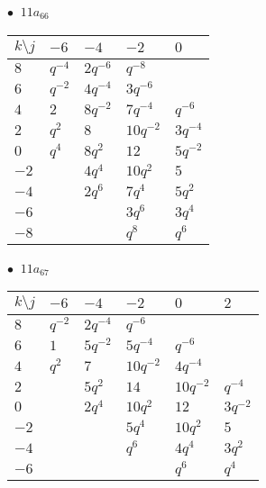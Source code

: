 \begin{minipage}{\linewidth}
$\bullet\ $ $11a_{66}$ \vspace{0.5em} \\
\begin{tabular}{l|llll}
$k \setminus j$ & $-6$ & $-4$ & $-2$ & $0$ \\
\hline
$8$ & $q^{-4}$ & $2q^{-6}$ & $q^{-8}$ &  \\
$6$ & $q^{-2}$ & $4q^{-4}$ & $3q^{-6}$ &  \\
$4$ & $2$ & $8q^{-2}$ & $7q^{-4}$ & $q^{-6}$ \\
$2$ & $q^{2}$ & $8$ & $10q^{-2}$ & $3q^{-4}$ \\
$0$ & $q^{4}$ & $8q^{2}$ & $12$ & $5q^{-2}$ \\
$-2$ &  & $4q^{4}$ & $10q^{2}$ & $5$ \\
$-4$ &  & $2q^{6}$ & $7q^{4}$ & $5q^{2}$ \\
$-6$ &  &  & $3q^{6}$ & $3q^{4}$ \\
$-8$ &  &  & $q^{8}$ & $q^{6}$ \\
\end{tabular}
\vspace{2em}
\end{minipage}
%
\begin{minipage}{\linewidth}
$\bullet\ $ $11a_{67}$ \vspace{0.5em} \\
\begin{tabular}{l|lllll}
$k \setminus j$ & $-6$ & $-4$ & $-2$ & $0$ & $2$ \\
\hline
$8$ & $q^{-2}$ & $2q^{-4}$ & $q^{-6}$ &  &  \\
$6$ & $1$ & $5q^{-2}$ & $5q^{-4}$ & $q^{-6}$ &  \\
$4$ & $q^{2}$ & $7$ & $10q^{-2}$ & $4q^{-4}$ &  \\
$2$ &  & $5q^{2}$ & $14$ & $10q^{-2}$ & $q^{-4}$ \\
$0$ &  & $2q^{4}$ & $10q^{2}$ & $12$ & $3q^{-2}$ \\
$-2$ &  &  & $5q^{4}$ & $10q^{2}$ & $5$ \\
$-4$ &  &  & $q^{6}$ & $4q^{4}$ & $3q^{2}$ \\
$-6$ &  &  &  & $q^{6}$ & $q^{4}$ \\
\end{tabular}
\vspace{2em}
\end{minipage}
%
